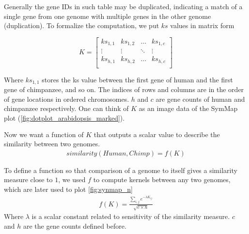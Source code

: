 \documentclass{vgtc}                      %
\begin{document}
Generally the gene IDs in such table may be duplicated, indicating a match of a single gene from one genome with multiple genes in the other genome (duplication). To formalize the computation, we put $ks$ values in matrix form

$$K = 
\begin{bmatrix}
ks_{1,1} & ks_{1,2} & \dots & ks_{1, c}\\
\vdots & \vdots & \ddots & \vdots \\
ks_{h,1} & ks_{h,2} & \dots & ks_{h, c}\\
\end{bmatrix}
$$

Where $ks_{1,1}$ stores the ks value between the first gene of human and the first gene of chimpanzee, and so on. The indices of rows and columns are in the order of gene locations in ordered chromosomes.
$h$ and $c$ are gene counts of human and chimpanzee respectively. One can think of $K$ as an image data of the SymMap plot (\autoref{fig:dotplot_arabidopsis_marked}).

Now we want a function of $K$ that outputs a scalar value to describe the similarity between two genomes.
\begin{align}
similarity(Human, Chimp) = f(K)
\end{align}


To define a function so that comparison of a genome to itself gives a similarity measure close to $1$, we used $f$ to compute kernels between any two genomes, which are later used to plot \autoref{fig:synmap_n}
\begin{align}
f(K) = \frac{\sum_{i,j} e^{-\lambda K_{ij}}}{\sqrt{c \times h}}
\end{align}
Where $\lambda$ is a scalar constant related to sensitivity of the similarity measure. $c$ and $h$ are the gene counts defined before. 
\end{document}
